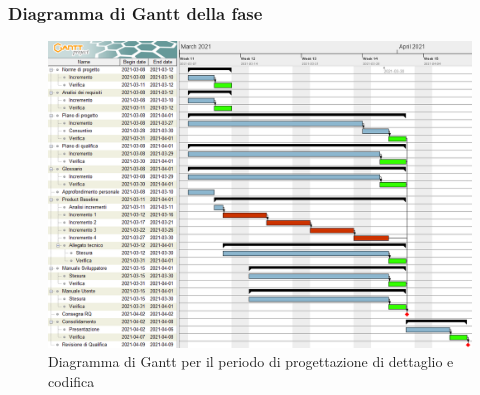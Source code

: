 \subsubsection{Diagramma di Gantt della fase}

\begin{figure}[H]
\centering

\centerline{\includegraphics[scale=0.6]{res/Pianificazione/Gantt/codifica}}
\caption{Diagramma di Gantt per il periodo di progettazione di dettaglio e codifica}
\end{figure}
